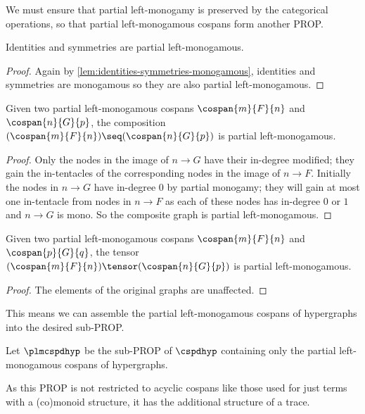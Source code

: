 We must ensure that partial left-monogamy is preserved by the categorical
operations, so that partial left-monogamous cospans form another PROP.

\begin{lemma}\label{lem:partial-monogamous-id-sym}
    Identities and symmetries are partial left-monogamous.
\end{lemma}
\begin{proof}
    Again by \cref{lem:identities-symmetries-monogamous}, identities and
    symmetries are monogamous so they are also partial left-monogamous.
\end{proof}

\begin{lemma}
    Given two partial left-monogamous cospans
    \(\cospan{m}{F}{n}\) and
    \(\cospan{n}{G}{p}\), the composition \(
    (\cospan{m}{F}{n})
    \seq
    (\cospan{n}{G}{p})
    \) is partial left-monogamous.
\end{lemma}
\begin{proof}
    Only the nodes in the image of \(n \to G\) have their in-degree modified;
    they gain the in-tentacles of the corresponding nodes in the image of
    \(n \to F\).
    Initially the nodes in \(n \to G\) have in-degree \(0\) by partial
    monogamy; they will gain at most one in-tentacle from nodes in
    \(n \to F\) as each of these nodes has in-degree \(0\) or \(1\) and
    \(n \to G\) is mono.
    So the composite graph is partial left-monogamous.
\end{proof}

\begin{lemma}
    Given two partial left-monogamous cospans \(\cospan{m}{F}{n}\)
    and \(\cospan{p}{G}{q}\), the tensor \(
    (\cospan{m}{F}{n})
    \tensor
    (\cospan{n}{G}{p})
    \) is partial left-monogamous.
\end{lemma}
\begin{proof}
    The elements of the original graphs are unaffected.
\end{proof}

This means we can assemble the partial left-monogamous cospans of hypergraphs
into the desired sub-PROP.

\begin{definition}
    Let \(\plmcspdhyp\) be the sub-PROP of \(\cspdhyp\) containing only the
    partial left-monogamous cospans of hypergraphs.
\end{definition}

As this PROP is not restricted to acyclic cospans like those used for just
terms with a (co)monoid structure, it has the additional structure of a trace.

